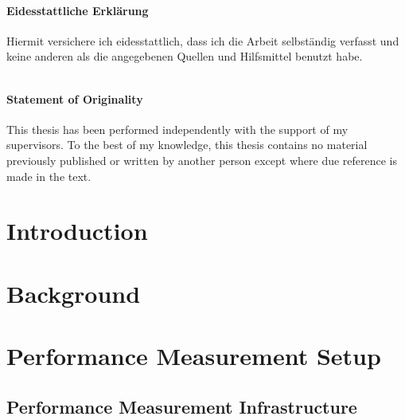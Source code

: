 \documentclass[
	12pt,
	a4paper,
	oneside,
	openright
]{book}
\begin{document}
\frontmatter

\newpage
\thispagestyle{empty}


 $$\qquad$$
 $$\qquad$$
 $$\qquad$$
  $$\qquad$$
 $$\qquad$$
 $$\qquad$$
 
\subsubsection*{Eidesstattliche Erklärung}
 Hiermit versichere ich eidesstattlich, dass ich die Arbeit selbständig verfasst und keine anderen
als die angegebenen Quellen und Hilfsmittel benutzt habe.

\vspace{1.3cm}

  $$\qquad$$
 $$\qquad$$
 $$\qquad$$
\subsubsection*{Statement of Originality}
This thesis has been performed independently with the support of my
supervisors. To the best of my knowledge, this thesis contains no material previously published or written
by another person except where due reference is made in the text.

\vspace{1.3cm}


\tableofcontents

\mainmatter
\chapter{Introduction}\label{chapter:1}
\setcounter{page}{1}


\chapter{Background}\label{chapter:2}


\chapter{Performance Measurement Setup}\label{chapter:3}


\section{Performance Measurement Infrastructure}
\end{document}

